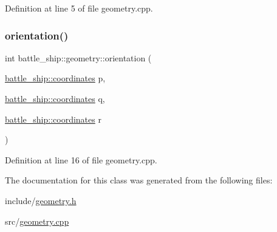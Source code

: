 Definition at line 5 of file geometry.\+cpp.

\mbox{\label{classbattle__ship_1_1geometry_abe15f3d75f562cb7f67f0facfad73628}} 
\subsubsection{\texorpdfstring{orientation()}{orientation()}}
{\footnotesize\ttfamily int battle\+\_\+ship\+::geometry\+::orientation (\begin{DoxyParamCaption}\item[{\hyperlink{structbattle__ship_1_1coordinates}{battle\+\_\+ship\+::coordinates}}]{p,  }\item[{\hyperlink{structbattle__ship_1_1coordinates}{battle\+\_\+ship\+::coordinates}}]{q,  }\item[{\hyperlink{structbattle__ship_1_1coordinates}{battle\+\_\+ship\+::coordinates}}]{r }\end{DoxyParamCaption})\hspace{0.3cm}{\ttfamily [static]}}



Definition at line 16 of file geometry.\+cpp.



The documentation for this class was generated from the following files\+:\begin{DoxyCompactItemize}
\item 
include/\hyperlink{geometry_8h}{geometry.\+h}\item 
src/\hyperlink{geometry_8cpp}{geometry.\+cpp}\end{DoxyCompactItemize}

